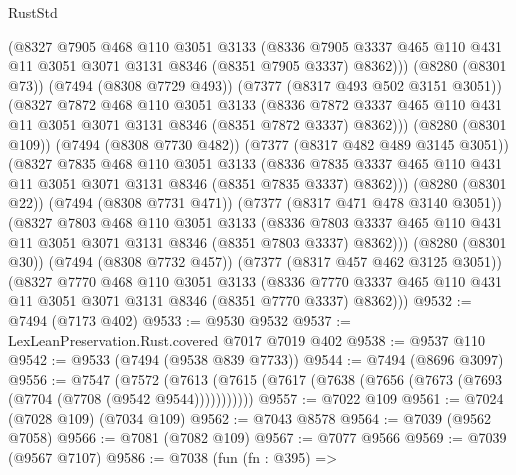 \begin{lexlean}{RustStd}
\begin{coremodule}
{\begin{coremodule}
{{{{{{{{{{{{{{{{{{{{{{{{{{{{{{{{              (@8327
                @7905
                @468
                @110
                @3051
                @3133
                (@8336
                  @7905
                  @3337
                  @465
                  @110
                  @431
                  @11
                  @3051
                  @3071
                  @3131
                  @8346
                  (@8351 @7905 @3337)
                  @8362)))
            (@8280 (@8301 @73))
            (@7494 (@8308 @7729 @493))
            (@7377 (@8317 @493 @502 @3151 @3051))
            (@8327
              @7872
              @468
              @110
              @3051
              @3133
              (@8336
                @7872
                @3337
                @465
                @110
                @431
                @11
                @3051
                @3071
                @3131
                @8346
                (@8351 @7872 @3337)
                @8362)))
          (@8280 (@8301 @109))
          (@7494 (@8308 @7730 @482))
          (@7377 (@8317 @482 @489 @3145 @3051))
          (@8327
            @7835
            @468
            @110
            @3051
            @3133
            (@8336
              @7835
              @3337
              @465
              @110
              @431
              @11
              @3051
              @3071
              @3131
              @8346
              (@8351 @7835 @3337)
              @8362)))
        (@8280 (@8301 @22))
        (@7494 (@8308 @7731 @471))
        (@7377 (@8317 @471 @478 @3140 @3051))
        (@8327
          @7803
          @468
          @110
          @3051
          @3133
          (@8336 @7803 @3337 @465 @110 @431 @11 @3051 @3071 @3131 @8346 (@8351 @7803 @3337) @8362)))
      (@8280 (@8301 @30))
      (@7494 (@8308 @7732 @457))
      (@7377 (@8317 @457 @462 @3125 @3051))
      (@8327
        @7770
        @468
        @110
        @3051
        @3133
        (@8336 @7770 @3337 @465 @110 @431 @11 @3051 @3071 @3131 @8346 (@8351 @7770 @3337) @8362)))
@9532 := @7494 (@7173 @402)
@9533 := @9530 @9532
@9537 := LexLeanPreservation.Rust.covered @7017 @7019 @402
@9538 := @9537 @110
@9542 := @9533 (@7494 (@9538 @839 @7733))
@9544 := @7494 (@8696 @3097)
@9556 := @7547
    (@7572 (@7613 (@7615 (@7617 (@7638 (@7656 (@7673 (@7693 (@7704 (@7708 (@9542 @9544)))))))))))
@9557 := @7022 @109
@9561 := @7024 (@7028 @109) (@7034 @109)
@9562 := @7043 @8578
@9564 := @7039 (@9562 @7058)
@9566 := @7081 (@7082 @109)
@9567 := @7077 @9566
@9569 := @7039 (@9567 @7107)
@9586 := @7038
    (fun (fn : @395) =>
}}}}}}}}}}}}}}}}}}}}}}}}}}}}}}}}
\end{coremodule}}
\end{coremodule}
\end{lexlean}
